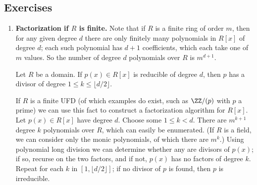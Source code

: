 \documentclass{article}
\begin{document}
\subsection*{Exercises}

\begin{enumerate}
\item \textbf{Factorization if $R$ is finite.} Note that if $R$ is a finite ring of order $m$, then for any given degree $d$ there are only finitely many polynomials in $R[x]$ of degree $d$; each such polynomial has $d+1$ coefficients, which each take one of $m$ values. So the number of degree $d$ polynomials over $R$ is $m^{d+1}$.

\begin{prop}
Let $R$ be a domain. If $p(x) \in R[x]$ is reducible of degree $d$, then $p$ has a divisor of degree $1 \leq k \leq \lfloor d/2 \rfloor$.
\end{prop}

If $R$ is a finite UFD (of which examples do exist, such as $\ZZ/(p)$ with $p$ a prime) we can use this fact to construct a factorization algorithm for $R[x]$. Let $p(x) \in R[x]$ have degree $d$. Choose some $1 \leq k < d$. There are $m^{k+1}$ degree $k$ polynomials over $R$, which can easily be enumerated. (If $R$ is a field, we can consider only the monic polynomials, of which there are $m^k$.) Using polynomial long division we can determine whether any are divisors of $p(x)$; if so, recurse on the two factors, and if not, $p(x)$ has no factors of degree $k$. Repeat for each $k$ in $[1,\lfloor d/2 \rfloor]$; if no divisor of $p$ is found, then $p$ is irreducible. 
\end{enumerate}
\end{document}
